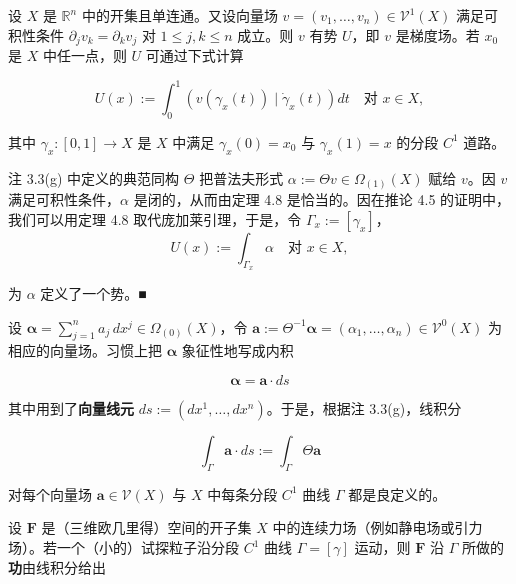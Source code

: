\begin{remark}

\begin{items}
\item

设 $ X $ 是 $ \mathbb{R}^{n} $ 中的开集且单连通。又设向量场 $ v = (v_{1},\ldots,v_{n}) \in \mathcal{V}^{1}(X) $ 满足可积性条件 $ \partial_{j}v_{k} = \partial_{k}v_{j} $ 对 $ 1 \le j,k \le n $ 成立。则 $ v $ 有势 $ U $，即 $ v $ 是梯度场。若 $ x_{0} $ 是 $ X $ 中任一点，则 $ U $ 可通过下式计算

\[
U(x) := \int_{0}^{1}\left(v(\gamma_{x}(t))\mid\dot{\gamma}_{x}(t)\right)dt \quad \text{对 } x \in X ,
\]

其中 $ \gamma_{x} : [0,1] \to X $ 是 $ X $ 中满足 $ \gamma_{x}(0) = x_{0} $ 与 $ \gamma_{x}(1) = x $ 的分段 $ C^{1} $ 道路。

\proofhead
注 3.3(g) 中定义的典范同构 $ \Theta $ 把普法夫形式 $ \alpha := \Theta v \in \Omega_{(1)}(X) $ 赋给 $ v $。因 $ v $ 满足可积性条件，$ \alpha $ 是闭的，从而由定理 4.8 是恰当的。因在推论 4.5 的证明中，我们可以用定理 4.8 取代庞加莱引理，于是，令 $ \Gamma_{x} := [\gamma_{x}] $，
\[
U(x) := \int_{\Gamma_{x}}\alpha \quad \text{对 } x \in X ,
\]

为 $ \alpha $ 定义了一个势。\nobreak\hspace{0.35em}■

\item

设 $ \boldsymbol{\alpha} = \sum_{j=1}^{n}a_{j}\,dx^{j} \in \Omega_{(0)}(X) $，令 $ \boldsymbol{a} := \Theta^{-1}\boldsymbol{\alpha} = (\alpha_{1},\ldots,\alpha_{n}) \in \mathcal{V}^{0}(X) $ 为相应的向量场。习惯上把 $ \boldsymbol{\alpha} $ 象征性地写成内积

\[
\boldsymbol{\alpha} = \boldsymbol{a}\cdot ds
\]

其中用到了\textbf{向量线元} $ ds := (dx^{1},\ldots,dx^{n}) $。于是，根据注 3.3(g)，线积分

\[
\int_{\Gamma}\boldsymbol{a}\cdot ds := \int_{\Gamma}\Theta\boldsymbol{a}
\]

对每个向量场 $ \boldsymbol{a} \in \mathcal{V}(X) $ 与 $ X $ 中每条分段 $ C^{1} $ 曲线 $ \Gamma $ 都是良定义的。

\item

设 $ \boldsymbol{F} $ 是（三维欧几里得）空间的开子集 $ X $ 中的连续力场（例如静电场或引力场）。若一个（小的）试探粒子沿分段 $ C^{1} $ 曲线 $ \Gamma = [\gamma] $ 运动，则 $ \boldsymbol{F} $ 沿 $ \Gamma $ 所做的\textbf{功}由线积分给出


\end{items}
\end{remark}
